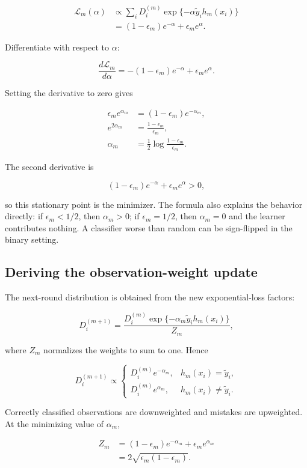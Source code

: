 \documentclass[11pt]{article}
\begin{document}
\begin{align*}
\mathcal L_m(\alpha)
&\propto
 \sum_i D_i^{(m)}\exp\{-\alpha\tilde y_i h_m(x_i)\}\\
&=(1-\epsilon_m)e^{-\alpha}+\epsilon_m e^{\alpha}.
\end{align*}

Differentiate with respect to $\alpha$:

\[
 \frac{d\mathcal L_m}{d\alpha}
 =-(1-\epsilon_m)e^{-\alpha}+\epsilon_m e^\alpha.
\]

Setting the derivative to zero gives

\begin{align*}
 \epsilon_m e^{\alpha_m}
 &=(1-\epsilon_m)e^{-\alpha_m},\\
 e^{2\alpha_m}
 &=\frac{1-\epsilon_m}{\epsilon_m},\\
 \alpha_m
 &=\boxed{\frac12\log\frac{1-\epsilon_m}{\epsilon_m}}.
\end{align*}

The second derivative is

\[
 (1-\epsilon_m)e^{-\alpha}+\epsilon_m e^\alpha>0,
\]

so this stationary point is the minimizer. The formula also explains the
behavior directly: if $\epsilon_m<1/2$, then $\alpha_m>0$; if
$\epsilon_m=1/2$, then $\alpha_m=0$ and the learner contributes nothing. A
classifier worse than random can be sign-flipped in the binary setting.

\subsection{Deriving the observation-weight update}

The next-round distribution is obtained from the new exponential-loss factors:

\[
 D_i^{(m+1)}
 =\frac{D_i^{(m)}
 \exp\{-\alpha_m\tilde y_i h_m(x_i)\}}{Z_m},
\]

where $Z_m$ normalizes the weights to sum to one. Hence

\[
 D_i^{(m+1)}\propto
 \begin{cases}
 D_i^{(m)}e^{-\alpha_m}, & h_m(x_i)=\tilde y_i,\\[2mm]
 D_i^{(m)}e^{\alpha_m}, & h_m(x_i)\neq\tilde y_i.
 \end{cases}
\]

Correctly classified observations are downweighted and mistakes are
upweighted. At the minimizing value of $\alpha_m$,

\begin{align*}
 Z_m
 &=(1-\epsilon_m)e^{-\alpha_m}+\epsilon_m e^{\alpha_m}\\
 &=2\sqrt{\epsilon_m(1-\epsilon_m)}.
\end{align*}
\end{document}
